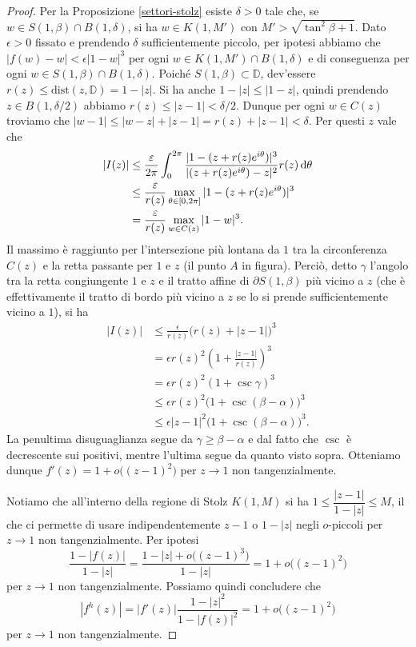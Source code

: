 \begin{proof}
  Per la Proposizione \ref{settori-stolz} esiste $\delta>0$ tale che, se $w \in S(1,\beta) \cap B(1,\delta)$, si ha $w \in K(1,M')$ con $M'>\sqrt{\tan^2\beta+1}$.
  Dato $\epsilon>0$ fissato e prendendo $\delta$ sufficientemente piccolo, per ipotesi abbiamo che $|f(w)-w|<\epsilon|1-w|^3$ per ogni $w \in K(1,M') \cap B(1,\delta)$ e di conseguenza per ogni $w \in S(1,\beta) \cap B(1,\delta)$.
  Poiché $S(1,\beta) \subset \mathbb{D}$, dev'essere $r(z) \le \text{dist}(z,\mathbb{D})=1-|z|$. Si ha anche $1-|z| \le |1-z|$, quindi prendendo $z \in B(1,\delta/2)$ abbiamo $r(z) \le |z-1|<\delta/2$. Dunque per ogni $w \in C(z)$ troviamo che $|w-1| \le |w-z|+|z-1|=r(z)+|z-1|<\delta$. Per questi $z$ vale che
  \begin{align*}
    |I(z)| & \le \frac{\varepsilon}{2\pi} \int_0^{2\pi} \frac{|1-(z+r(z)e^{i\theta})|^3}{|(z+r(z)e^{i\theta})-z|^2}r(z)\mathop{}\!\mathrm{d}\theta \\
    & \le \frac{\varepsilon}{r(z)}\max_{\theta \in [0,2\pi]} |1-(z+r(z)e^{i\theta})|^3 \\
    & =\frac{\varepsilon}{r(z)}\max_{w \in C(z)}|1-w|^3.
  \end{align*}
  Il massimo è raggiunto per l'intersezione più lontana da $1$ tra la circonferenza $C(z)$ e la retta passante per $1$ e $z$ (il punto $A$ in figura). Perciò, detto $\gamma$ l'angolo tra la retta congiungente $1$ e $z$ e il tratto affine di $\partial S(1,\beta)$ più vicino a $z$ (che è effettivamente il tratto di bordo più vicino a $z$ se lo si prende sufficientemente vicino a $1$), si ha
  \begin{align*}
    |I(z)| & \le \frac{\epsilon}{r(z)}\bigl(r(z)+|z-1|\bigr)^3 \\
    & =\epsilon r(z)^2\left(1+\frac{|z-1|}{r(z)}\right)^3 \\
    & =\epsilon r(z)^2(1+\csc\gamma)^3 \\
    & \le \epsilon r(z)^2\bigl(1+\csc(\beta-\alpha)\bigr)^3 \\
    & \le \epsilon |z-1|^2\bigl(1+\csc(\beta-\alpha)\bigr)^3.
  \end{align*}
  La penultima disuguaglianza segue da $\gamma \ge \beta-\alpha$ e dal fatto che $\csc$ è decrescente sui positivi, mentre l'ultima segue da quanto visto sopra. Otteniamo dunque $f'(z)=1+o\bigl((z-1)^2\bigr)$ per $z \longrightarrow 1$ non tangenzialmente.

  Notiamo che all'interno della regione di Stolz $K(1,M)$ si ha $1 \le \dfrac{|z-1|}{1-|z|} \le M$, il che ci  permette di usare indipendentemente $z-1$ o $1-|z|$ negli $o$-piccoli per $z \longrightarrow 1$ non tangenzialmente. Per ipotesi
  $$\frac{1-|f(z)|}{1-|z|}=\frac{1-|z|+o\bigl((z-1)^3\bigr)}{1-|z|}=1+o\bigl((z-1)^2\bigr)$$
  per $z \longrightarrow 1$ non tangenzialmente. Possiamo quindi concludere che
  $$|f^h(z)|=|f'(z)|\frac{1-|z|^2}{1-|f(z)|^2}=1+o\bigl((z-1)^2\bigr)$$
  per $z \longrightarrow 1$ non tangenzialmente.
\end{proof}
